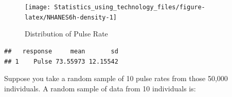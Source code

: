 \documentclass[
]{book}
\newenvironment{Shaded}{\begin{snugshade}}{\end{snugshade}}
\newcommand{\DataTypeTok}[1]{\textcolor[rgb]{0.13,0.29,0.53}{#1}}
\newcommand{\DecValTok}[1]{\textcolor[rgb]{0.00,0.00,0.81}{#1}}
\newcommand{\KeywordTok}[1]{\textcolor[rgb]{0.13,0.29,0.53}{\textbf{#1}}}
\newcommand{\NormalTok}[1]{#1}
\newcommand{\OperatorTok}[1]{\textcolor[rgb]{0.81,0.36,0.00}{\textbf{#1}}}
\newcommand{\StringTok}[1]{\textcolor[rgb]{0.31,0.60,0.02}{#1}}
\begin{document}
\begin{figure}
\texttt{[image: Statistics\_using\_technology\_files/figure-latex/NHANES6h-density-1]} \caption{Distribution of Pulse Rate}\label{fig:NHANES6h-density}
\end{figure}

\begin{verbatim}
##   response     mean       sd
## 1    Pulse 73.55973 12.15542
\end{verbatim}

Suppose you take a random sample of 10 pulse rates from those 50,000 individuals. A random sample of data from 10 individuals is:

\begin{Shaded}
\end{Shaded}
\end{document}
